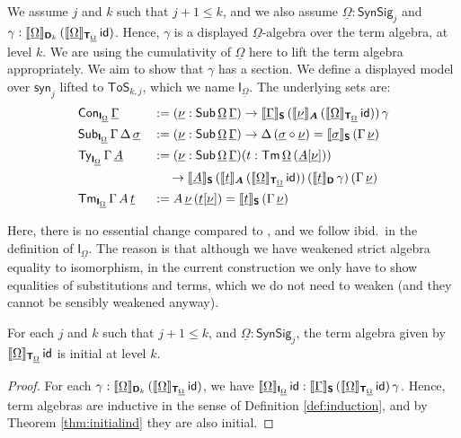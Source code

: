 \documentclass[sigplan,review,anonymous]{acmart}\settopmatter{printfolios=true,printccs=false,printacmref=false}
\newcommand{\ToS}{\mathsf{ToS}}
\newcommand{\syn}{\mathsf{syn}}
\newcommand{\SynSig}{\mathsf{SynSig}}
\newcommand{\bA}{\boldsymbol{A}}
\newcommand{\bT}{\boldsymbol{\mathsf{T}}}
\newcommand{\bS}{\boldsymbol{\mathsf{S}}}
\newcommand{\bD}{\boldsymbol{\mathsf{D}}}
\newcommand{\bI}{\boldsymbol{\mathsf{I}}}
\newcommand{\ul}[1]{\underline{#1}}
\newcommand{\ulGamma}{\ul{\Gamma}}
\newcommand{\ulOmega}{\ul{\Omega}}
\newcommand{\ulsigma}{\ul{\sigma}}
\newcommand{\ulnu}{\ul{\nu}}
\newcommand{\ult}{\ul{t}}
\newcommand{\ulA}{\ul{A}}
\newcommand{\llb}{\llbracket}
\newcommand{\rrb}{\rrbracket}
\begin{document}
\begin{definition} We assume $j$ and $k$ such that $j + 1 \leq k$, and we also assume
$\ulOmega : \SynSig_j$ and $\gamma :
\llb\ulOmega\rrb_{\bD_k}\,(\llb\ulOmega\rrb_{\bT_{\ulOmega}}\,\id)$.  Hence, $\gamma$ is
a displayed $\ulOmega$-algebra over the term algebra, at level $k$. We are using
the cumulativity of $\ulOmega$ here to lift the term algebra appropriately.
We aim to show that $\gamma$ has a section. We define a displayed model over $\syn_j$ lifted
to $\ToS_{k, j}$, which we name $\bI_{\ulOmega}$. The underlying sets are:
\begin{alignat*}{3}
  & \Con_{\bI_{\ulOmega}}\,\ulGamma &&:= (\ulnu : \Sub\,\ulOmega\,\ulGamma)\ra
  \llb\ulGamma\rrb_{\bS}\,(\llb\ulnu\rrb_{\bA}\,(\llb\ulOmega\rrb_{\bT_{\ulOmega}}\,\id))\,\gamma\\
  & \Sub_{\bI_{\ulOmega}}\,\Gamma\,\Delta\,\ulsigma && := (\ulnu : \Sub\,\ulOmega\,\ulGamma)\ra
    \Delta\,(\ulsigma\circ\ulnu) = \llb\ulsigma\rrb_{\bS}\,(\Gamma\,\ulnu)\\
  & \Ty_{\bI_{\ulOmega}}\,\Gamma\,\ulA &&:=
  (\ulnu : \Sub\,\ulOmega\,\ulGamma)(t : \Tm\,\ulOmega\,(\ulA[\ulnu]))\\
  & && \hspace{1.2em}\ra
  \llb\ulA\rrb_{\bS}\,(\llb\ult\rrb_{\bA}\,(\llb\ulOmega\rrb_{\bT_{\ulOmega}}\,\id))\,
  (\llb\ult\rrb_{\bD}\,\gamma)\,(\Gamma\,\ulnu)\\
  & \Tm_{\bI_{\ulOmega}}\,\Gamma\,A\,\ult &&:= A\,\ulnu\,(\ult[\ulnu]) = \llb\ult\rrb_{\bS}\,(\Gamma\,\ulnu)
\end{alignat*}

Here, there is no essential change compared to \cite{kaposi2019constructing},
and we follow ibid.\ in the definition of $\bI_{\ulOmega}$. The reason is that although we
have weakened strict algebra equality to isomorphism, in the current
construction we only have to show equalities of substitutions and terms, which
we do not need to weaken (and they cannot be sensibly weakened anyway).
\end{definition}

\begin{theorem} For each $j$ and $k$ such that $j + 1 \leq k$, and $\ulOmega : \SynSig_j$, the term algebra given by $\llb\ulOmega\rrb_{\bT_{\ulOmega}}\,\id$ is initial at level $k$.
\end{theorem}
\begin{proof}
For each $\gamma :
\llb\ulOmega\rrb_{\bD_k}\,(\llb\ulOmega\rrb_{\bT_{\ulOmega}}\,\id)$, we have
$\llb\ulOmega\rrb_{\bI_{\ulOmega}}\,\id :
\llb\ulGamma\rrb_{\bS}\,(\llb\ulOmega\rrb_{\bT_{\ulOmega}}\,\id)\,\gamma$. Hence,
term algebras are inductive in the sense of Definition \ref{def:induction}, and
by Theorem \ref{thm:initialind} they are also initial.
\end{proof}
\end{document}
